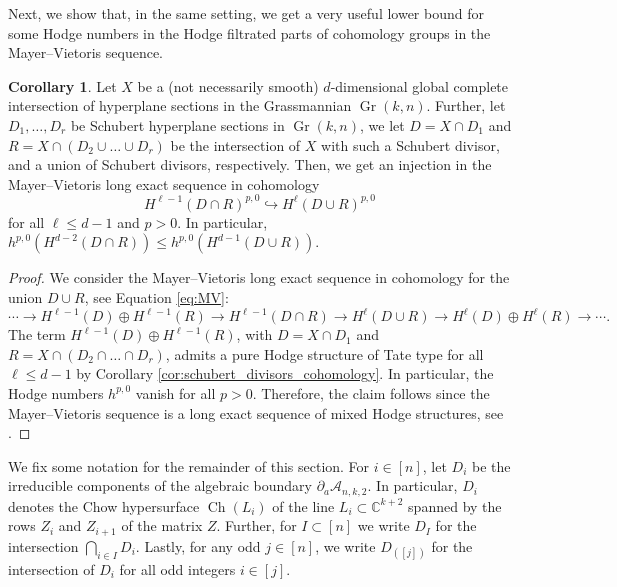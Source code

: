 \documentclass[12pt]{extarticle}
\theoremstyle{definition}
\theoremstyle{theorem}
\newtheorem{corollary}[definition]{Corollary}
\theoremstyle{remark}
\numberwithin{equation}{section}
\newcommand{\C}{\mathbb{C}}
\DeclareMathOperator{\gr}{Gr}
\newcommand{\aA}{\mathcal{A}}
\newcommand{\CH}{\operatorname{Ch}}
\newcommand{\odd}[1]{([#1])}
\begin{document}
Next, we show that, in the same setting, we get a very useful lower bound for some Hodge numbers in the Hodge filtrated parts of cohomology groups in the Mayer--Vietoris sequence.
\begin{corollary}\label{cor:injection}
    Let $X$ be a (not necessarily smooth) $d$-dimensional global complete intersection of hyperplane sections in the Grassmannian $\gr(k,n)$. 
    Further, let $D_1,\ldots,D_r$ be Schubert hyperplane sections in $\gr(k,n)$, we let $D=X\cap D_1$ and $R = X\cap (D_2\cup\ldots\cup D_r)$ be the intersection of $X$ with such a Schubert divisor, and a union of Schubert divisors, respectively.
    Then, we get an injection in the Mayer--Vietoris long exact sequence in cohomology
    \[
    H^{\ell-1}(D\cap R)^{p,0}\hookrightarrow H^\ell(D\cup R)^{p,0}
    \]
    for all $\ell\leq d-1$ and $p>0$. In particular, $h^{p,0}( H^{d-2}(D\cap R))\leq h^{p,0}( H^{d-1}(D\cup R))$. 
\end{corollary}
\begin{proof}
    We consider the Mayer--Vietoris long exact sequence in cohomology for the union $D\cup R$, see Equation \eqref{eq:MV}:
    \[
    \cdots \to H^{\ell-1}(D) \oplus H^{\ell-1}(R)\to H^{\ell-1}(D\cap R) \to H^\ell(D\cup R) \to H^\ell(D) \oplus H^\ell(R) \to \cdots.
    \]
    The term $H^{\ell-1}(D) \oplus H^{\ell-1}(R)$, with $D=X\cap D_1$ and $R=X\cap(D_2\cap\ldots\cap D_r)$, admits a pure Hodge structure of Tate type for all $\ell\leq d-1$ by Corollary \ref{cor:schubert_divisors_cohomology}.
    In particular, the Hodge numbers $h^{p,0}$ vanish for all $p>0$.
    Therefore, the claim follows since the Mayer--Vietoris sequence is a long exact sequence of mixed Hodge structures, see \cite[C.30]{Dimca_sing_hypersurfaces}.
\end{proof}

We fix some notation for the remainder of this section.
For $i\in [n]$, let $D_i$ be the irreducible components of the algebraic boundary $\partial_a\aA_{n,k,2}$. In particular, $D_i$ denotes the Chow hypersurface $\CH(L_i)$ of the line $L_i\subset \C^{k+2}$ spanned by the rows $Z_i$ and $Z_{i+1}$ of the matrix $Z$.
Further, for $I\subset [n]$ we write $D_I$ for the intersection $\bigcap_{i\in I}D_i$. Lastly, for any odd $j\in [n]$, we write $D_{\odd j}$ for the intersection of $D_i$ for all odd integers $i\in[j]$.
\end{document}
